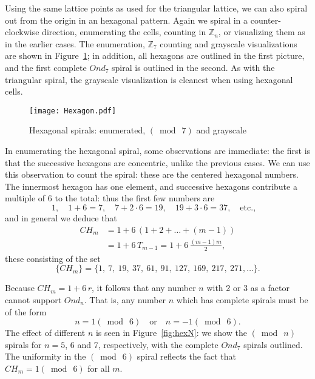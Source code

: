 \documentclass{article}
\theoremstyle{definition}
\def\ZZ{\mathbb{Z}}
\def\pmod#1{(\bmod\  #1)}
\def\com#1{\quad\text{{#1}}\quad}
\begin{document}
Using the same lattice points as used for the triangular lattice, we
can also spiral out from the origin in an hexagonal pattern.  Again we
spiral in a counter-clockwise direction, enumerating the cells,
counting in $\ZZ_n$, or visualizing them as in the earlier cases.  The
enumeration, $\ZZ_7$ counting and grayscale visualizations are shown
in Figure~\ref{fig:hex}; in addition, all hexagons are outlined in the
first picture, and the first complete $Ond_7$ spiral is outlined in
the second.  As with the triangular spiral, the grayscale
visualization is cleanest when using hexagonal cells.

\begin{figure}[htb]
  \centering
  \texttt{[image: Hexagon.pdf]}
  \caption{Hexagonal spirals: enumerated, $\pmod 7$ and grayscale}
  \label{fig:hex}
\end{figure}

In enumerating the hexagonal spiral, some observations are immediate:
the first is that the successive hexagons are concentric, unlike the
previous cases.  We can use this observation to count the spiral:
these are the centered hexagonal numbers.  The innermost hexagon has
one element, and successive hexagons contribute a multiple of 6 to the
total: thus the first few numbers are
\[
  1,\quad 1+6=7,\quad 7+2\cdot6=19,\quad 19+3\cdot6=37, \com{etc.,}
\]
and in general we deduce that
\begin{align*}
  CH_m &= 1 + 6\,(1 + 2 + \dots + (m-1) ) \\
       &= 1 + 6\,T_{m-1} = 1 + 6\,\textstyle{\frac{(m-1)m}2},
\end{align*}
these consisting of the set
\[
  \{CH_m\} = \{ 1,\ 7,\ 19,\ 37,\ 61,\ 91,\ 
        127,\ 169,\ 217,\ 271,\ldots \}.
\]

Because $CH_m = 1+6\,r$, it follows that any number $n$ with 2 or 3 as
a factor cannot support $Ond_n$.  That is, any number $n$ which has
complete spirals must be of the form
\[
  n = 1 \pmod 6  \com{or}  n = -1 \pmod 6.
\]
The effect of different $n$ is seen in Figure~\ref{fig:hexN}: we show
the $\pmod n$ spirals for $n=5$, 6 and 7, respectively, with the
complete $Ond_7$ spirals outlined.  The uniformity in the $\pmod6$
spiral reflects the fact that $CH_m=1\pmod6$ for all $m$.
\end{document}
